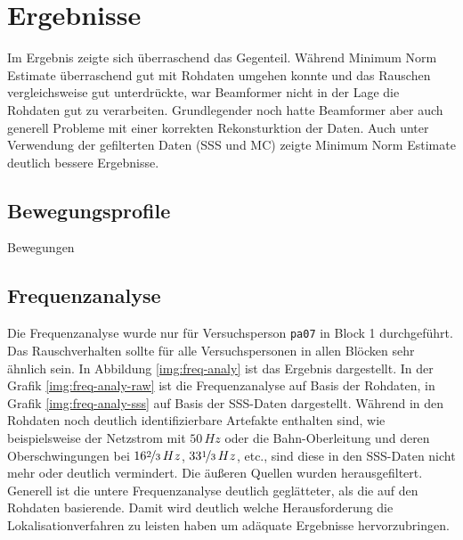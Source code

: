\documentclass[doc,a4paper,12pt]{apa6}
\begin{document}
\newpage
\section{Ergebnisse}
\label{sec:ergebnisse}

Im Ergebnis zeigte sich überraschend das Gegenteil. Während Minimum Norm Estimate überraschend gut mit Rohdaten umgehen konnte und das Rauschen vergleichsweise gut unterdrückte, war Beamformer nicht in der Lage die Rohdaten gut zu verarbeiten. Grundlegender noch hatte Beamformer aber auch generell Probleme mit einer korrekten Rekonsturktion der Daten. Auch unter Verwendung der gefilterten Daten (SSS und MC) zeigte Minimum Norm Estimate deutlich bessere Ergebnisse.

\subsection{Bewegungsprofile}
\label{sec:bewegung}

Bewegungen

\subsection{Frequenzanalyse}
\label{sec:freq-analy}

Die Frequenzanalyse wurde nur für Versuchsperson \texttt{pa07} in Block 1 durchgeführt. Das Rauschverhalten sollte für alle Versuchspersonen in allen Blöcken sehr ähnlich sein. In Abbildung \ref{img:freq-analy} ist das Ergebnis dargestellt. In der Grafik \ref{img:freq-analy-raw} ist die Frequenzanalyse auf Basis der Rohdaten, in Grafik \ref{img:freq-analy-sss} auf Basis der SSS-Daten dargestellt. Während in den Rohdaten noch deutlich identifizierbare Artefakte enthalten sind, wie beispielsweise der Netzstrom mit $50\,Hz$ oder die Bahn-Oberleitung und deren Oberschwingungen bei $16\nicefrac{2}{3}\,Hz$, $33\nicefrac{1}{3}\,Hz$, etc., sind diese in den SSS-Daten nicht mehr oder deutlich vermindert. Die äußeren Quellen wurden herausgefiltert. Generell ist die untere Frequenzanalyse deutlich geglätteter, als die auf den Rohdaten basierende. Damit wird deutlich welche Herausforderung die Lokalisationverfahren zu leisten haben um adäquate Ergebnisse hervorzubringen.

\end{document}
